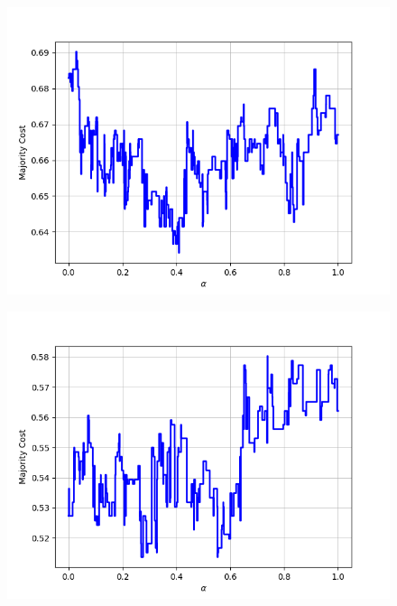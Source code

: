 \begin{figure}[H]
\begin{minipage}{.24\textwidth}
  {\includegraphics[width=\linewidth]{plots/omniglot-intra-ac-cnn/Malay_(Jawi_-_Arabic)}}
\end{minipage}
\begin{minipage}{.24\textwidth}
  \centering
  {\includegraphics[width=\linewidth]{plots/omniglot-intra-ac-cnn/Mkhedruli_(Georgian)}}
\end{minipage}
\begin{minipage}{.24\textwidth}
  \centering

\end{minipage}
\end{figure}
